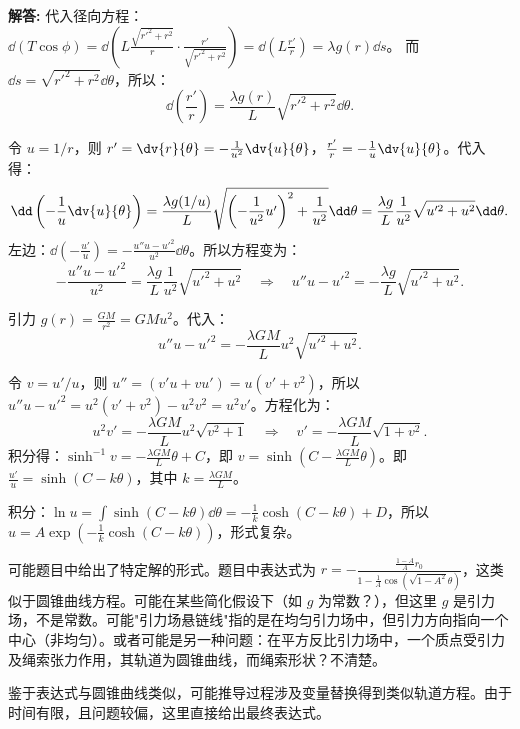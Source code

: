 \documentclass[12pt, a4paper, oneside]{ctexart}
\newenvironment{solution}{\par\noindent\textbf{解答:}\quad}{\par}
\begin{document}
\begin{solution}
    代入径向方程：\(\dd(T \cos\phi) = \dd\left( L \frac{\sqrt{r'^2 + r^2}}{r} \cdot \frac{r'}{\sqrt{r'^2 + r^2}} \right) = \dd\left( L \frac{r'}{r} \right) = \lambda g(r) \dd s\)。
    而 \(\dd s = \sqrt{r'^2 + r^2} \dd \theta\)，所以：
    \[
    \dd\left( \frac{r'}{r} \right) = \frac{\lambda g(r)}{L} \sqrt{r'^2 + r^2} \dd \theta.
    \]
    
    令 \(u = 1/r\)，则 \(r' = \dv{r}{\theta} = -\frac{1}{u^2} \dv{u}{\theta}\)，\(\frac{r'}{r} = -\frac{1}{u} \dv{u}{\theta}\)。代入得：
    \[
    \dd\left( -\frac{1}{u} \dv{u}{\theta} \right) = \frac{\lambda g(1/u)}{L} \sqrt{ \left(-\frac{1}{u^2} u'\right)^2 + \frac{1}{u^2} } \dd \theta = \frac{\lambda g}{L} \frac{1}{u^2} \sqrt{u'^2 + u^2} \dd \theta.
    \]
    左边：\(\dd\left( -\frac{u'}{u} \right) = -\frac{u'' u - u'^2}{u^2} \dd \theta\)。所以方程变为：
    \[
    -\frac{u'' u - u'^2}{u^2} = \frac{\lambda g}{L} \frac{1}{u^2} \sqrt{u'^2 + u^2} \quad \Rightarrow \quad u'' u - u'^2 = -\frac{\lambda g}{L} \sqrt{u'^2 + u^2}.
    \]
    
    引力 \(g(r) = \frac{GM}{r^2} = GM u^2\)。代入：
    \[
    u'' u - u'^2 = -\frac{\lambda GM}{L} u^2 \sqrt{u'^2 + u^2}.
    \]
    
    令 \(v = u' / u\)，则 \(u'' = (v' u + v u') = u (v' + v^2)\)，所以 \(u'' u - u'^2 = u^2 (v' + v^2) - u^2 v^2 = u^2 v'\)。方程化为：
    \[
    u^2 v' = -\frac{\lambda GM}{L} u^2 \sqrt{v^2 + 1} \quad \Rightarrow \quad v' = -\frac{\lambda GM}{L} \sqrt{1+v^2}.
    \]
    积分得：\(\sinh^{-1} v = -\frac{\lambda GM}{L} \theta + C\)，即 \(v = \sinh(C - \frac{\lambda GM}{L} \theta)\)。即 \(\frac{u'}{u} = \sinh(C - k \theta)\)，其中 \(k = \frac{\lambda GM}{L}\)。
    
    积分：\(\ln u = \int \sinh(C - k \theta) \dd \theta = -\frac{1}{k} \cosh(C - k \theta) + D\)，所以 \(u = A \exp\left( -\frac{1}{k} \cosh(C - k \theta) \right)\)，形式复杂。
    
    可能题目中给出了特定解的形式。题目中表达式为 \(r = -\frac{\frac{1-A}{A} r_0}{1 - \frac{1}{A} \cos(\sqrt{1-A^2} \theta)}\)，这类似于圆锥曲线方程。可能在某些简化假设下（如 \(g\) 为常数？），但这里 \(g\) 是引力场，不是常数。可能"引力场悬链线"指的是在均匀引力场中，但引力方向指向一个中心（非均匀）。或者可能是另一种问题：在平方反比引力场中，一个质点受引力及绳索张力作用，其轨道为圆锥曲线，而绳索形状？不清楚。
    
    鉴于表达式与圆锥曲线类似，可能推导过程涉及变量替换得到类似轨道方程。由于时间有限，且问题较偏，这里直接给出最终表达式。
\end{solution}
\end{document}
